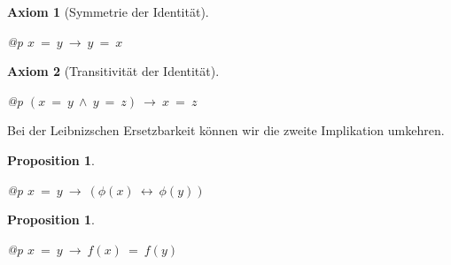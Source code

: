 \documentclass[a4paper,german,10pt,twoside]{book}
\newtheorem{prop}[thm]{Proposition}
\newtheorem{ax}{Axiom}
\theoremstyle{definition}
\theoremstyle{remark}
\begin{document}
\par


\begin{ax}[Symmetrie der Identit{\"a}t]
\label{axiom:symmetryOfIdentity} \hypertarget{axiom:symmetryOfIdentity}{}
\mbox{}
\begin{longtable}{{@{\extracolsep{\fill}}p{\linewidth}}}
\centering $x \ =  \ y\ \rightarrow \ y \ =  \ x$
\end{longtable}

\end{ax}




\par


\begin{ax}[Transitivit{\"a}t der Identit{\"a}t]
\label{axiom:transitivityOfIdentity} \hypertarget{axiom:transitivityOfIdentity}{}
\mbox{}
\begin{longtable}{{@{\extracolsep{\fill}}p{\linewidth}}}
\centering $(x \ =  \ y\ \land \ y \ =  \ z)\ \rightarrow \ x \ =  \ z$
\end{longtable}

\end{ax}




\par
Bei der Leibnizschen Ersetzbarkeit k{\"o}nnen wir die zweite Implikation umkehren.

\begin{prop}
\label{theorem:leibnizEquivalence} \hypertarget{theorem:leibnizEquivalence}{}
\mbox{}
\begin{longtable}{{@{\extracolsep{\fill}}p{\linewidth}}}
\centering $x \ =  \ y\ \rightarrow \ (\phi(x)\ \leftrightarrow \ \phi(y))$
\end{longtable}

\end{prop}




\par


\begin{prop}
\label{theorem:identyImpliesFunctionalEquality} \hypertarget{theorem:identyImpliesFunctionalEquality}{}
\mbox{}
\begin{longtable}{{@{\extracolsep{\fill}}p{\linewidth}}}
\centering $x \ =  \ y\ \rightarrow \ f(x) \ =  \ f(y)$
\end{longtable}

\end{prop}
\end{document}

